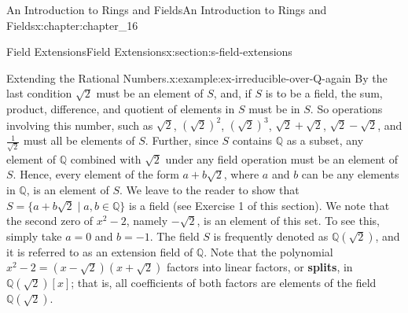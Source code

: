 \documentclass[twoside,10pt,]{book}
\newcommand{\xreffont}{\relax}
\newcommand{\terminology}[1]{\textbf{#1}}
\numberwithin{equation}{section}
\begin{document}
\begin{chapterptx}{An Introduction to Rings and Fields}{}{An Introduction to Rings and Fields}{}{}{x:chapter:chapter_16}
\begin{sectionptx}{Field Extensions}{}{Field Extensions}{}{}{x:section:s-field-extensions}
\begin{example}{Extending the Rational Numbers.}{x:example:ex-irreducible-over-Q-again}
By the last condition  \(\sqrt{2}\) must be an element of \(S\), and, if \(S\) is to be a field, the sum, product, difference, and quotient of elements in \(S\) must be in \(S\). So operations involving this number, such as  \(\sqrt{2}\), \(\left(\sqrt{2}\right)^2\), \(\left(\sqrt{2}\right)^3\), \(\sqrt{2}+\sqrt{2}\), \(\sqrt{2}-\sqrt{2}\), and \(\frac{1}{\sqrt{2}}\)  must all be elements of \(S\).   Further, since \(S\) contains \(\mathbb{Q}\) as a subset, any element of \(\mathbb{Q}\) combined with \(\sqrt{2}\) under any field operation must be an element of \(S\). Hence, every element of the form \(a + b \sqrt{2}\), where \(a\) and \(b\) can be any elements in \(\mathbb{Q}\), is an element of \(S\). We leave to the reader to show that \(S =\{a + b \sqrt{2} \mid a, b \in \mathbb{Q}\}\) is a field (see Exercise 1 of this section). We note that the second zero of \(x^2 - 2\), namely  \(-\sqrt{2}\), is an element of this set. To see this, simply take \(a = 0\) and \(b = -1\). The field \(S\) is frequently denoted as \(\mathbb{Q}\left(\sqrt{2}\right)\), and it is referred to as an extension field of \(\mathbb{Q}\).  Note that the polynomial \(x^2-2=\left(x-\sqrt{2}\right)\left(x+\sqrt{2}\right)\) factors into linear factors, or \terminology{splits}, in \(\mathbb{Q}\left(\sqrt{2}\right)[x]\); that is, all coefficients of both factors are elements of the field \(\mathbb{Q}\left(\sqrt{2}\right)\).%
\end{example}
\end{sectionptx}
\end{chapterptx}
\end{document}
